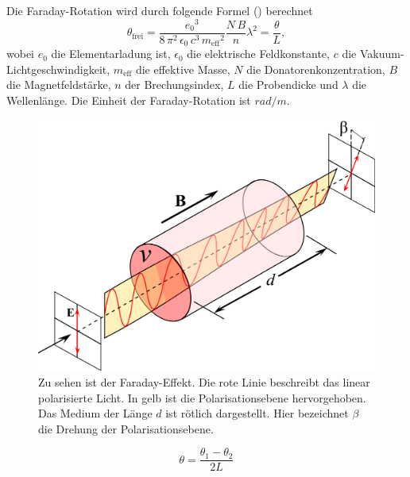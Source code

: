 Die Faraday-Rotation wird durch folgende Formel (\cite{V46}) berechnet
\begin{equation}
    \theta_\text{frei} = \frac{{e_0}^3}{8 \, \pi^2 \, \epsilon_0 \, c^3 \, {m_\text{eff}}^2} \frac{N \, B}{n} \lambda^2 = \frac{\theta}{L},
    \label{eq:theta}
\end{equation}
wobei $e_0$ die Elementarladung ist, $\epsilon_0$ die elektrische Feldkonstante, $c$ die Vakuum-Lichtgeschwindigkeit, $m_\text{eff}$ die effektive Masse, $N$ die Donatorenkonzentration, $B$ die Magnetfeldstärke, $n$ der Brechungsindex, $L$ die Probendicke und $\lambda$ die Wellenlänge.
Die Einheit der Faraday-Rotation ist $rad/m$.

\begin{figure}
    \centering
    \includegraphics[width=12cm]{fotos/FaradayEffekt.png}
    \caption{Zu sehen ist der Faraday-Effekt. Die rote Linie beschreibt das linear polarisierte Licht. In gelb ist die Polarisationsebene hervorgehoben. Das Medium der Länge $d$ ist rötlich dargestellt. Hier bezeichnet $\beta$ die Drehung der Polarisationsebene. \cite{Faraday}}
    \label{fig:FaradayEffekt}    
\end{figure}

\begin{equation}
    \theta = \frac{\theta_1 - \theta_2}{2L}
\end{equation}
